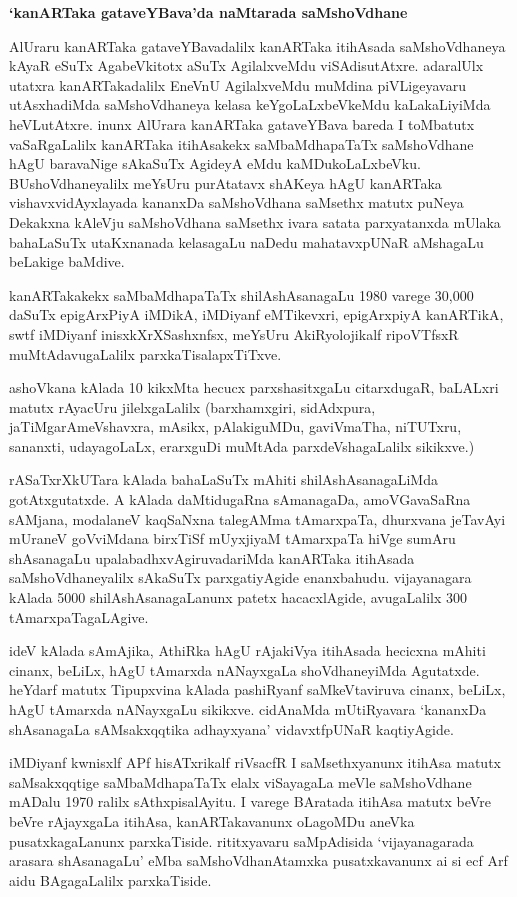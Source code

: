 \documentclass[11pt,a4size]{article}
\begin{document}
\bigskip
\centerline{\textbf{\Large{`kanARTaka gataveYBava'da naMtarada saMshoVdhane}}}
\medskip

AlUraru kanARTaka gataveYBavadalilx kanARTaka itihAsada saMshoVdhaneya
kAyaR eSuTx AgabeVkitotx aSuTx AgilalxveMdu viSAdisutAtxre. adaralUlx
utatxra kanARTakadalilx EneVnU AgilalxveMdu muMdina piVLigeyavaru
utAsxhadiMda saMshoVdhaneya kelasa keYgoLaLxbeVkeMdu kaLakaLiyiMda
heVLutAtxre. inunx AlUrara kanARTaka gataveYBava bareda I toMbatutx
vaSaRgaLalilx kanARTaka itihAsakekx saMbaMdhapaTaTx saMshoVdhane hAgU
baravaNige sAkaSuTx AgideyA eMdu kaMDukoLaLxbeVku. BUshoVdhaneyalilx
meYsUru purAtatavx shAKeya hAgU kanARTaka vishavxvidAyxlayada kananxDa
saMshoVdhana saMsethx matutx puNeya Dekakxna kAleVju saMshoVdhana
saMsethx ivara satata parxyatanxda mUlaka bahaLaSuTx utaKxnanada
kelasagaLu naDedu mahatavxpUNaR aMshagaLu beLakige baMdive.

kanARTakakekx saMbaMdhapaTaTx shilAshAsanagaLu 1980 varege
  30,000 daSuTx epigArxPiyA iMDikA, iMDiyanf eMTikevxri, epigArxpiyA
  kanARTikA, swtf iMDiyanf inisxkXrXSashxnfsx, meYsUru AkiRyolojikalf
  ripoVTfsxR muMtAdavugaLalilx parxkaTisalapxTiTxve.

ashoVkana kAlada 10 kikxMta hecucx parxshasitxgaLu citarxdugaR,
baLALxri matutx rAyacUru jilelxgaLalilx (barxhamxgiri, sidAdxpura,
jaTiMgarAmeVshavxra, mAsikx, pAlakiguMDu, gaviVmaTha, niTUTxru,
sananxti, udayagoLaLx, erarxguDi muMtAda parxdeVshagaLalilx sikikxve.)

rASaTxrXkUTara kAlada bahaLaSuTx mAhiti shilAshAsanagaLiMda
gotAtxgutatxde. A kAlada daMtidugaRna sAmanagaDa, amoVGavaSaRna
sAMjana, modalaneV kaqSaNxna talegAMma tAmarxpaTa, dhurxvana jeTavAyi
mUraneV goVviMdana birxTiSf mUyxjiyaM tAmarxpaTa hiVge sumAru
shAsanagaLu upalabadhxvAgiruvadariMda kanARTaka itihAsada
saMshoV\-dhaneyalilx sAkaSuTx parxgatiyAgide enanxbahudu. vijayanagara
kAlada 5000 shilAshAsanagaLanunx patetx hacacxlAgide, avugaLalilx 300
tAmarxpaTagaLAgive.

ideV kAlada sAmAjika, AthiRka hAgU rAjakiVya itihAsada hecicxna mAhiti
cinanx, beLiLx, hAgU tAmarxda nANayxgaLa shoVdhaneyiMda
Agutatxde. heYdarf matutx Tipupxvina kAlada pashiRyanf saMkeVtaviruva
cinanx, beLiLx, hAgU tAmarxda nANayxgaLu sikikxve. cidAnaMda
mUtiRyavara `kananxDa shAsanagaLa sAMsakxqqtika adhayxyana'
vidavxtfpUNaR kaqtiyAgide.

iMDiyanf kwnisxlf APf hisATxrikalf riVsacfR I saMsethxyanunx itihAsa
matutx saMsakxqqtige saMbaMdhapaTaTx elalx viSayagaLa meVle
saMshoVdhane mADalu 1970 ralilx sAthxpisalAyitu. I varege BAratada
itihAsa matutx beVre beVre rAjayxgaLa itihAsa, kanARTakavanunx
oLagoMDu aneVka pusatxkagaLanunx parxkaTiside. rititxyavaru
saMpAdisida `vijayanagarada arasara shAsanagaLu' eMba saMshoVdhanAtamxka
pusatxkavanunx ai si ecf Arf aidu BAgagaLalilx parxkaTiside.
\end{document}
